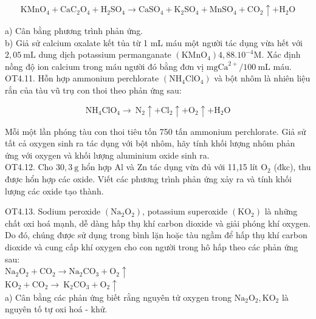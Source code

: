 \documentclass[10pt]{article}
\begin{document}
$$
\mathrm{KMnO}_{4}+\mathrm{CaC}_{2} \mathrm{O}_{4}+\mathrm{H}_{2} \mathrm{SO}_{4} \rightarrow \mathrm{CaSO}_{4}+\mathrm{K}_{2} \mathrm{SO}_{4}+\mathrm{MnSO}_{4}+\mathrm{CO}_{2} \uparrow+\mathrm{H}_{2} \mathrm{O}
$$

a) Cân bằng phương trình phản ứng.\\
b) Giả sử calcium oxalate kết tủa từ 1 mL máu một người tác dụng vừa hết với $2,05 \mathrm{~mL}$ dung dịch potassium permanganate $\left(\mathrm{KMnO}_{4}\right) 4,88.10^{-4} \mathrm{M}$. Xác định nồng độ ion calcium trong máu người đó bằng đơn vị $\mathrm{mg} \mathrm{Ca}^{2+} / 100 \mathrm{~mL}$ máu.\\
OT4.11. Hỗn hợp ammonium perchlorate $\left(\mathrm{NH}_{4} \mathrm{ClO}_{4}\right)$ và bột nhôm là nhiên liệu rắn của tàu vũ trụ con thoi theo phản ứng sau:

$$
\mathrm{NH}_{4} \mathrm{ClO}_{4} \rightarrow \mathrm{~N}_{2} \uparrow+\mathrm{Cl}_{2} \uparrow+\mathrm{O}_{2} \uparrow+\mathrm{H}_{2} \mathrm{O}
$$

Mỗi một lần phóng tàu con thoi tiêu tốn 750 tấn ammonium perchlorate. Giả sử tất cả oxygen sinh ra tác dụng với bột nhôm, hãy tính khối lượng nhôm phản ứng với oxygen và khối lượng aluminium oxide sinh ra.\\
OT4.12. Cho $30,3 \mathrm{~g}$ hổn hợp Al và Zn tác dụng vừa đủ với 11,15 lít $\mathrm{O}_{2}$ (đkc), thu được hổn hợp các oxide. Viết các phương trình phản ứng xảy ra và tính khối lượng các oxide tạo thành.

OT4.13. Sodium peroxide $\left(\mathrm{Na}_{2} \mathrm{O}_{2}\right)$, potassium superoxide $\left(\mathrm{KO}_{2}\right)$ là những chất oxi hoá mạnh, dễ dàng hấp thụ khí carbon dioxide và giải phóng khí oxygen. Do đó, chúng được sử dụng trong bình lặn hoặc tàu ngầm để hấp thụ khí carbon dioxide và cung cấp khí oxygen cho con người trong hô hấp theo các phản ứng sau:\\
$\mathrm{Na}_{2} \mathrm{O}_{2}+\mathrm{CO}_{2} \rightarrow \mathrm{Na}_{2} \mathrm{CO}_{3}+\mathrm{O}_{2} \uparrow$\\
$\mathrm{KO}_{2}+\mathrm{CO}_{2} \rightarrow \mathrm{~K}_{2} \mathrm{CO}_{3}+\mathrm{O}_{2} \uparrow$\\
a) Cân bằng các phản ứng biết rằng nguyên tử oxygen trong $\mathrm{Na}_{2} \mathrm{O}_{2}, \mathrm{KO}_{2}$ là nguyên tố tự oxi hoá - khử.
\end{document}
